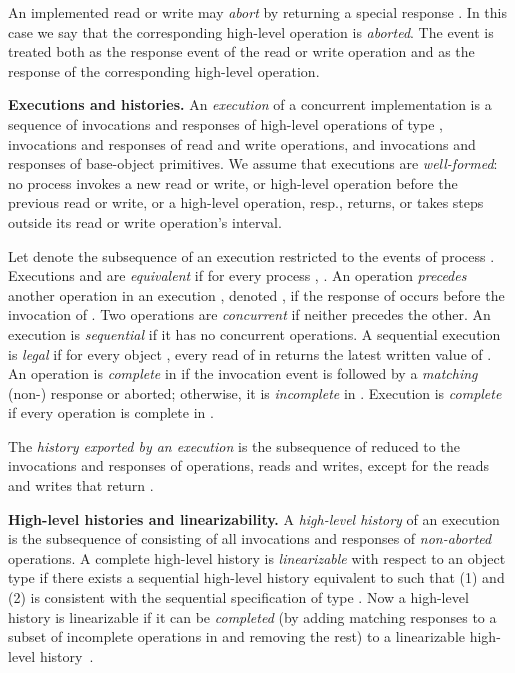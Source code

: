 \documentclass[11pt,pdftex,letterpaper]{article}
\begin{document}
An implemented read or write may \emph{abort} by returning a special response
. In this case we say that the corresponding high-level
operation is \emph{aborted}. 
The  event is treated both as the response event of the read or
write operation and as the response of the corresponding high-level operation.   

\vspace{1mm}\noindent\textbf{Executions and histories.}
An \emph{execution} of a concurrent implementation is a sequence
of invocations and responses of high-level operations of type , invocations and responses of read and write
operations, and invocations and responses of base-object primitives.
We assume that executions are \emph{well-formed}:
no process invokes a new read or write, or high-level operation before
the previous read or write, or a high-level operation, resp., 
returns, or takes steps outside its read or write operation's interval.


Let  denote the subsequence of an execution 
restricted to the events of process .
Executions  and  are \emph{equivalent} if for every process
, .
An operation  \emph{precedes} another operation  in an execution
, 
denoted , 
if the response of  occurs before the invocation of .
Two operations are \emph{concurrent} if neither precedes
the other. 
An execution is \emph{sequential} if it has no concurrent 
operations. 
A sequential execution  is \emph{legal} 
if for every object , every read of  in  
returns the latest written value of .
An operation is \emph{complete} in  if the invocation event is
followed by a \emph{matching} (non-) response or aborted; otherwise, it is \emph{incomplete} in .
Execution  is \emph{complete} if every operation is complete in .

The \emph{history exported by an execution } is
the subsequence of  reduced to the invocations and responses
of operations,  reads and writes, except for the reads
and writes that return . 

\vspace{1mm}\noindent\textbf{High-level histories and linearizability.}
A \emph{high-level history}  of an execution  is the subsequence of  consisting of all
invocations and responses of \emph{non-aborted} operations.
A complete high-level history  is \emph{linearizable} with 
respect to an object type  if there exists
a sequential high-level history  equivalent to  such that
(1)  and
(2)  
is consistent with the sequential specification of type .
Now a high-level history  is linearizable if it can be
\emph{completed} (by adding matching responses to a subset of
incomplete operations in  and removing the rest)
to a linearizable high-level history~\cite{HW90,AW04}.
\end{document}
